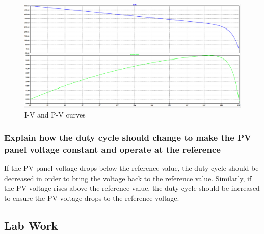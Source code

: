 \documentclass[]{article}
\begin{document}
    	       	\begin{figure}[H]
    	       		\centering
    	        	\includegraphics[width=\textwidth]{Prework_images/IVCurve}
    	        	\caption{I-V and P-V curves}
    	        	\label{fig:IVCurve}
    	        \end{figure}
    	    \subsubsection{Explain how the duty cycle should change to make the PV panel voltage constant and operate at the reference}
    	        If the PV panel voltage drops below the reference value, the duty cycle should be decreased in order to bring the voltage back to the reference value. Similarly, if the PV voltage rises above the reference value, the duty cycle should be increased to ensure the PV voltage drops to the reference voltage.
        
        \subsection{Lab Work}
\end{document}
